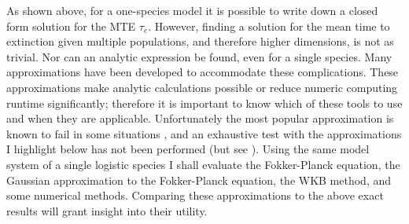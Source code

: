 As shown above, for a one-species model it is possible to write down a closed form solution for the MTE $\tau_e$.
However, finding a solution for the mean time to extinction given multiple populations, and therefore higher dimensions, is not as trivial. %
Nor can an analytic expression be found, even for a single species. 
Many approximations have been developed to accommodate these complications. 
These approximations make analytic calculations possible or reduce numeric computing runtime significantly; therefore it is important to know which of these tools to use and when they are applicable. 
Unfortunately the most popular approximation is known to fail in some situations \cite{Grasman1983,Doering2005}, and an exhaustive test with the approximations I highlight below has not been performed (but see \cite{Allen2003a,Yu2017}). 
Using the same model system of a single logistic species I shall evaluate the Fokker-Planck equation, the Gaussian approximation to the Fokker-Planck equation, the WKB method, and some numerical methods. %
Comparing these approximations to the above exact results will grant insight into their utility. %

